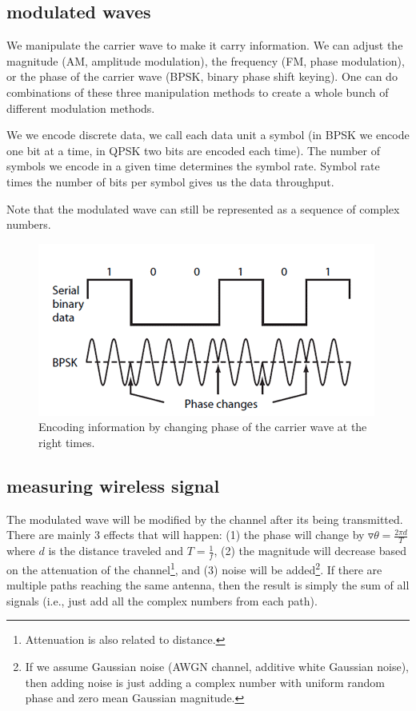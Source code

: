 \documentclass[10pt]{article}
\begin{document}
\subsection{modulated waves}
We manipulate the carrier wave to make it carry information.  We can adjust the magnitude (AM, amplitude modulation), the frequency (FM, phase modulation), or the phase of the carrier wave (BPSK, binary phase shift keying).  One can do combinations of these three manipulation methods to create a whole bunch of different modulation methods.

We we encode discrete data, we call each data unit a symbol (in BPSK we encode one bit at a time, in QPSK two bits are encoded each time).  The number of symbols we encode in a given time determines the symbol rate.  Symbol rate times the number of bits per symbol gives us the data throughput.

Note that the modulated wave can still be represented as a sequence of complex numbers.

\begin{figure}[h!]
\begin{center}
\includegraphics[width=0.6\linewidth]{figs/bpsk}
\end{center}
\caption{Encoding information by changing phase of the carrier wave at the right times.}
\label{fig:bpsk}
\end{figure}


\subsection{measuring wireless signal}
The modulated wave will be modified by the channel after its being transmitted.  There are mainly 3 effects that will happen: (1) the phase will change by $\triangledown\theta=\frac{2\pi d}{T}$ where $d$ is the distance traveled and $T=\frac{1}{f}$, (2) the magnitude will decrease based on the attenuation of the channel\footnote{Attenuation is also related to distance.}, and (3) noise will be added\footnote{If we assume Gaussian noise (AWGN channel, additive white Gaussian noise), then adding noise is just adding a complex number with uniform random phase and zero mean Gaussian magnitude.}.  If there are multiple paths reaching the same antenna, then the result is simply the sum of all signals (i.e., just add all the complex numbers from each path).
\end{document}
